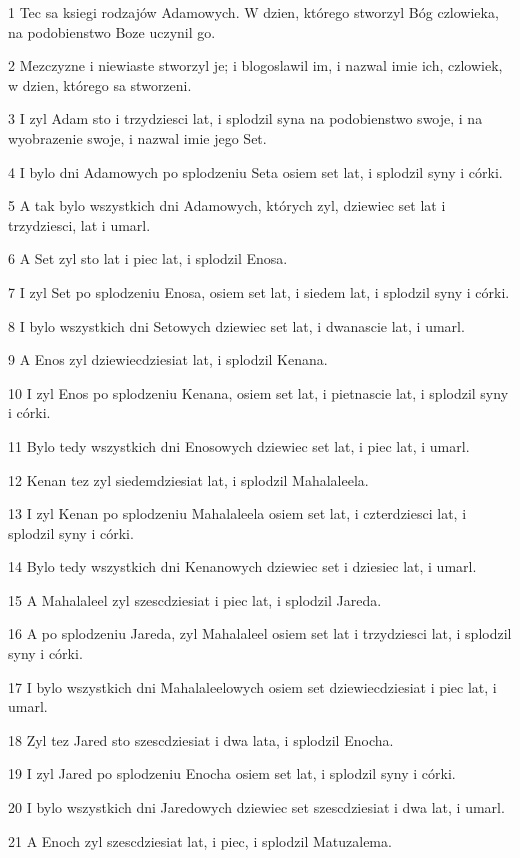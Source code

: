 \par 1 Tec sa ksiegi rodzajów Adamowych. W dzien, którego stworzyl Bóg czlowieka, na podobienstwo Boze uczynil go.
\par 2 Mezczyzne i niewiaste stworzyl je; i blogoslawil im, i nazwal imie ich, czlowiek, w dzien, którego sa stworzeni.
\par 3 I zyl Adam sto i trzydziesci lat, i splodzil syna na podobienstwo swoje, i na wyobrazenie swoje, i nazwal imie jego Set.
\par 4 I bylo dni Adamowych po splodzeniu Seta osiem set lat, i splodzil syny i córki.
\par 5 A tak bylo wszystkich dni Adamowych, których zyl, dziewiec set lat i trzydziesci, lat i umarl.
\par 6 A Set zyl sto lat i piec lat, i splodzil Enosa.
\par 7 I zyl Set po splodzeniu Enosa, osiem set lat, i siedem lat, i splodzil syny i córki.
\par 8 I bylo wszystkich dni Setowych dziewiec set lat, i dwanascie lat, i umarl.
\par 9 A Enos zyl dziewiecdziesiat lat, i splodzil Kenana.
\par 10 I zyl Enos po splodzeniu Kenana, osiem set lat, i pietnascie lat, i splodzil syny i córki.
\par 11 Bylo tedy wszystkich dni Enosowych dziewiec set lat, i piec lat, i umarl.
\par 12 Kenan tez zyl siedemdziesiat lat, i splodzil Mahalaleela.
\par 13 I zyl Kenan po splodzeniu Mahalaleela osiem set lat, i czterdziesci lat, i splodzil syny i córki.
\par 14 Bylo tedy wszystkich dni Kenanowych dziewiec set i dziesiec lat, i umarl.
\par 15 A Mahalaleel zyl szescdziesiat i piec lat, i splodzil Jareda.
\par 16 A po splodzeniu Jareda, zyl Mahalaleel osiem set lat i trzydziesci lat, i splodzil syny i córki.
\par 17 I bylo wszystkich dni Mahalaleelowych osiem set dziewiecdziesiat i piec lat, i umarl.
\par 18 Zyl tez Jared sto szescdziesiat i dwa lata, i splodzil Enocha.
\par 19 I zyl Jared po splodzeniu Enocha osiem set lat, i splodzil syny i córki.
\par 20 I bylo wszystkich dni Jaredowych dziewiec set szescdziesiat i dwa lat, i umarl.
\par 21 A Enoch zyl szescdziesiat lat, i piec, i splodzil Matuzalema.
